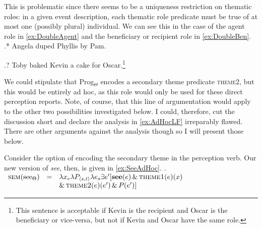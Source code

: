 This is problematic since there seems to be a uniqueness restriction on thematic roles: in a given event description, each thematic role predicate must be true of at most one (possibly plural) individual.
We can see this in the case of the agent role in \cref{ex:DoubleAgent} and the beneficiary or recipient role in \cref{ex:DoubleBen}.
\ex.* \label{ex:DoubleAgent} Angela duped Phyllis by Pam.

\ex.? \label{ex:DoubleBen} Toby baked Kevin a cake for Oscar.\footnote{
	This sentence is acceptable if Kevin is the recipient and Oscar is the beneficiary or vice-versa, but not if Kevin and Oscar have the same role.
}

We could stipulate that Prog$_{\Theta}$ encodes a secondary theme predicate \textsc{theme2}, but this would be entirely ad hoc, as this role would only be used for these direct perception reports.
Note, of course, that this line of argumentation would apply to the other two possibilities investigated below.
I could, therefore, cut the discussion short and declare the analysis in \cref{ex:AdHocLF} irreparably flawed.
There are other arguments against the analysis though so I will present those below.

Consider the option of encoding the secondary theme in the perception verb.
Our new version of \textit{see}, then, is given in \cref{ex:SeeAdHoc}.
\ex.\label{ex:SeeAdHoc}
$
\begin{array}[t]{rcl}
	\textsc{sem}(\text{see}_\Theta) & = & \lambda x_e \lambda P_{\langle s,t\rangle} \lambda e_{s} \exists e^{\prime} [\textbf{see}(e) \,\&\, \textsc{theme1}(e)(x) \\
		& & \&\, \textsc{theme2}(e)(e^{\prime}) \,\&\, P(e^{\prime})]
\end{array}
$

